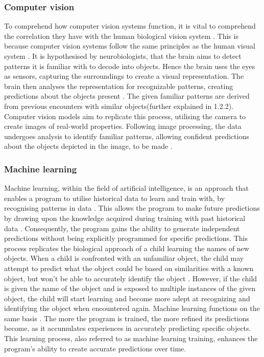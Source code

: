 \subsubsection{Computer vision}
To comprehend how computer vision systems function, it is vital to comprehend the correlation they have with the human biological vision system \parencite{DiCarlo2012}. This is because computer vision systems follow the same principles as the human visual system \parencite{Voulodimos2018}. It is hypothesised by neurobiologists, that the brain aims to detect patterns it is familiar with to decode into objects. Hence the brain uses the eyes as sensors, capturing the surroundings to create a visual representation. The brain then analyses the representation for recognizable patterns, creating predictions about the objects present . The given familiar patterns are derived from previous encounters with similar objects(further explained in 1.2.2). Computer vision models aim to replicate this process, utilising the camera to create images of real-world properties. Following image processing, the data undergoes analysis to identify familiar patterns, allowing confident predictions about the objects depicted in the image, to be made \parencite{Jahne2000}.

\subsubsection{Machine learning }
Machine learning, within the field of artificial intelligence, is an approach that enables a program to utilise historical data to learn and train with, by recognising patterns in data \parencite{Zhou2021}. This allows the program to make future predictions by drawing upon the knowledge acquired during training with past historical data \parencite{Mitchell1983}. Consequently, the program gains the ability to generate independent predictions without being explicitly programmed for specific predictions. This process replicates the biological approach of a child learning the names of new objects. When a child is confronted with an unfamiliar object, the child may attempt to predict what the object could be based on similarities with a known object, but won't be able to accurately identify the object \parencite{Harrington2012}. However,  if the child is given the name of the object and is exposed to multiple instances of the given object, the child will start learning and become more adept at recognizing and identifying the object when encountered again. Machine learning functions on the same basis \parencite{Gollapudi2016}. The more the program is trained, the more refined its predictions become, as it accumulates experiences in accurately predicting specific objects. This learning process, also referred to as machine learning training, enhances the program's ability to create accurate predictions over time. 

